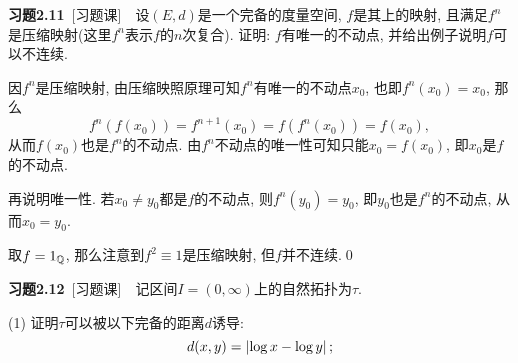     \textbf{习题2.11}\ [习题课]\ \ 设$ (E,d) $是一个完备的度量空间, $ f $是其上的映射, 且满足$ f^n $是压缩映射(这里$ f^n $表示$ f $的$ n $次复合). 证明: $ f $有唯一的不动点, 并给出例子说明$ f $可以不连续.
    \begin{Proof}
    因$ f^n $是压缩映射, 由压缩映照原理可知$ f^n $有唯一的不动点$ x_0 $, 也即$ f^n(x_0)=x_0 $, 那么
    \[
    f^n(f(x_0))=f^{n+1}(x_0)=f(f^n(x_0))=f(x_0),
    \]
    从而$ f(x_0) $也是$ f^n $的不动点. 由$ f^n $不动点的唯一性可知只能$ x_0=f(x_0) $, 即$ x_0 $是$ f $的不动点.

    再说明唯一性. 若$ x_0\ne y_0 $都是$ f $的不动点, 则$ f^n(y_0)=y_0 $, 即$ y_0 $也是$ f^n $的不动点, 从而$ x_0=y_0 $.

    取$ f=1_{\mathbb{Q}} $, 那么注意到$ f^2\equiv 1 $是压缩映射, 但$ f $并不连续.\qed
    \end{Proof}

    \textbf{习题2.12}\ [习题课]\ \ 记区间$ I=(0,\infty) $上的自然拓扑为$ \tau $.

    (1) 证明$ \tau $可以被以下完备的距离$ d $诱导:
    \[
    d(x,y)=\left| \log x-\log y \right| ;
    \]

